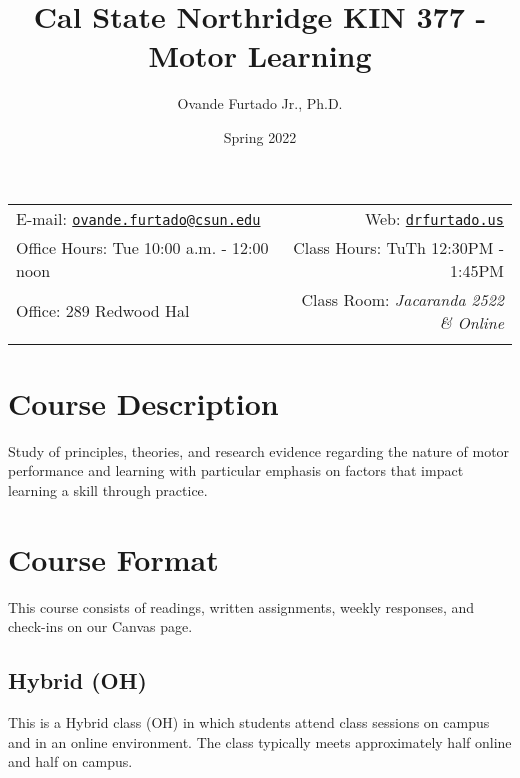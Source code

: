 \documentclass[11pt,]{article}
\title{Cal State Northridge \textbar{} KIN 377 - Motor Learning}
\author{Ovande Furtado Jr., Ph.D.}
\date{Spring 2022}
\begin{document}
  

		\maketitle
		
	
		\thispagestyle{firststyle}



	\noindent \begin{tabular*}{\textwidth}{ @{\extracolsep{\fill}} lr @{\extracolsep{\fill}}}


E-mail: \texttt{\href{mailto:ovande.furtado@csun.edu}{\nolinkurl{ovande.furtado@csun.edu}}} & Web: \href{http://drfurtado.us}{\tt drfurtado.us}\\
Office Hours: Tue 10:00 a.m. - 12:00 noon  &  Class Hours: TuTh 12:30PM
- 1:45PM\\
Office: 289 Redwood Hal  & Class Room: \emph{Jacaranda 2522 \& Online}\\
	&  \\
	\hline
	\end{tabular*}
	
\vspace{2mm}
	


\hypertarget{course-description}{%
\section{Course Description}\label{course-description}}

Study of principles, theories, and research evidence regarding the
nature of motor performance and learning with particular emphasis on
factors that impact learning a skill through practice.

\hypertarget{course-format}{%
\section{Course Format}\label{course-format}}

This course consists of readings, written assignments, weekly responses,
and check-ins on our Canvas page.

\hypertarget{hybrid-oh}{%
\subsection{Hybrid (OH)}\label{hybrid-oh}}

This is a Hybrid class (OH) in which students attend class sessions on
campus and in an online environment. The class typically meets
approximately half online and half on campus.
\end{document}
